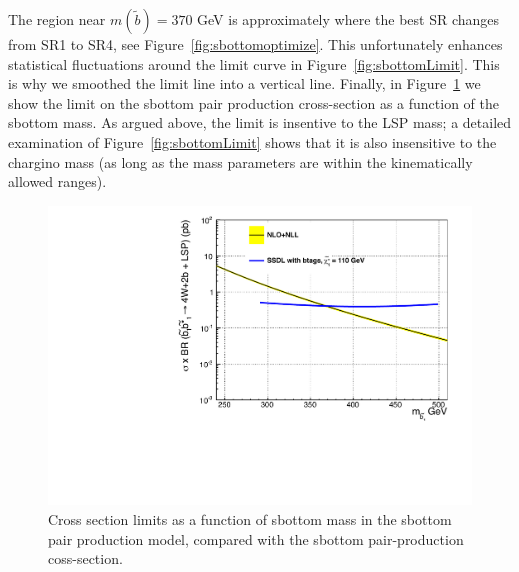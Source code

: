 The region near $m(\widetilde{b}) = 370$ GeV is approximately where 
the best SR changes from SR1 to SR4, see Figure~\ref{fig:sbottomoptimize}.
This unfortunately enhances statistical fluctuations around 
the limit curve in Figure~\ref{fig:sbottomLimit}.  This is why 
we smoothed the limit line into a vertical line.
Finally, in Figure~\ref{fig:sbottomLimit1d} we show the limit
on the sbottom pair production cross-section as a function of the 
sbottom mass.  As argued above, the limit is insentive to the 
LSP mass; a detailed examination of Figure~\ref{fig:sbottomLimit}
shows that it is also insensitive to the chargino mass (as long
as the mass parameters are within the kinematically allowed 
ranges).



\begin{figure}[htb]
\begin{center}
\includegraphics[width=0.49\linewidth]{figs/sbottom_1d.pdf}
\caption{Cross section limits as a function of sbottom mass
in the sbottom pair production model, compared with the 
sbottom pair-production coss-section.
\label{fig:sbottomLimit1d}}
\end{center}
\end{figure}

\clearpage






